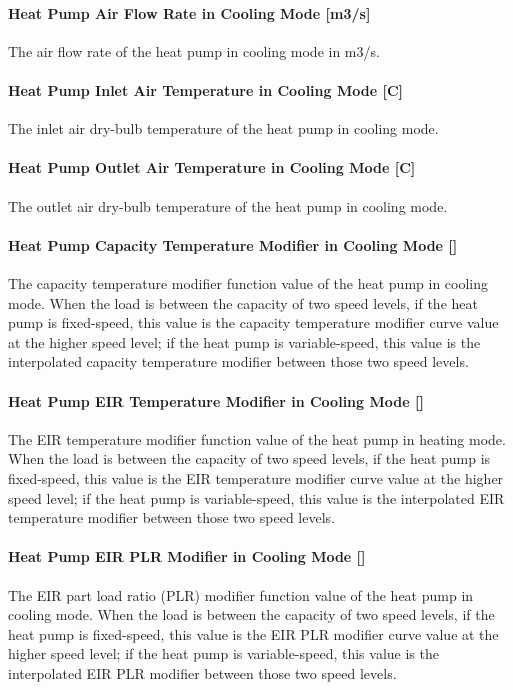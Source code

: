 \paragraph{Heat Pump Air Flow Rate in Cooling Mode {[}m3/s{]}}
The air flow rate of the heat pump in cooling mode in m3/s.
\paragraph{Heat Pump Inlet Air Temperature in Cooling Mode {[}C{]}}
The inlet air dry-bulb temperature of the heat pump in cooling mode.
\paragraph{Heat Pump Outlet Air Temperature in Cooling Mode {[}C{]}}
The outlet air dry-bulb temperature of the heat pump in cooling mode.
\paragraph{Heat Pump Capacity Temperature Modifier in Cooling Mode {[}{]}}
The capacity temperature modifier function value of the heat pump in cooling
mode. When the load is between the capacity of two speed levels, if the heat
pump is fixed-speed, this value is the capacity temperature modifier curve value
at the higher speed level; if the heat pump is variable-speed, this value is the
interpolated capacity temperature modifier between those two speed levels.
\paragraph{Heat Pump EIR Temperature Modifier in Cooling Mode {[}{]}}
The EIR temperature modifier function value of the heat pump in heating
mode. When the load is between the capacity of two speed levels, if the heat
pump is fixed-speed, this value is the EIR temperature modifier curve value
at the higher speed level; if the heat pump is variable-speed, this value is the
interpolated EIR temperature modifier between those two speed levels.
\paragraph{Heat Pump EIR PLR Modifier in Cooling Mode {[}{]}}
The EIR part load ratio (PLR) modifier function value of the heat pump in cooling
mode. When the load is between the capacity of two speed levels, if the heat
pump is fixed-speed, this value is the EIR PLR modifier curve value
at the higher speed level; if the heat pump is variable-speed, this value is the
interpolated EIR PLR modifier between those two speed levels.
